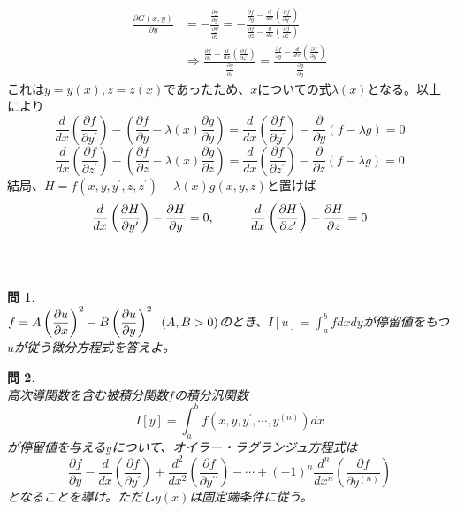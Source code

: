 \documentclass{jsarticle}
\newtheorem{pro}{問}[section]
\begin{document}
\begin{align*}
\frac{\partial G(x,y)}{\partial y}&=-\frac{\frac{\partial g}{\partial y}}{\frac{\partial g}{\partial z}}=-\frac{\frac{\partial f}{\partial y}-\frac{d}{dx}\left(\frac{\partial f}{\partial y^{\prime}}\right)}{\frac{\partial f}{\partial z}-\frac{d}{dx}\left(\frac{\partial f}{\partial z^{\prime}}\right)}\\
&\Longrightarrow\frac{\frac{\partial f}{\partial z}-\frac{d}{dx}\left(\frac{\partial f}{\partial z^{\prime}}\right)}{\frac{\partial g}{\partial z}}=\frac{\frac{\partial f}{\partial y}-\frac{d}{dx}\left(\frac{\partial f}{\partial y^{\prime}}\right)}{\frac{\partial g}{\partial y}}
\end{align*}
これは\(y=y(x),z=z(x)\)であったため、\(x\)についての式\(\lambda(x)\)となる。以上により
\[\frac{d}{dx}\left(\frac{\partial f}{\partial y^{\prime}}\right)-\left(\frac{\partial f}{\partial y}-\lambda(x)\frac{\partial g}{\partial y}\right)=\frac{d}{dx}\left(\frac{\partial f}{\partial y^{\prime}}\right)-\frac{\partial}{\partial y}(f-\lambda g)=0\]
\[\frac{d}{dx}\left(\frac{\partial f}{\partial z^{\prime}}\right)-\left(\frac{\partial f}{\partial z}-\lambda(x)\frac{\partial g}{\partial z}\right)=\frac{d}{dx}\left(\frac{\partial f}{\partial z^{\prime}}\right)-\frac{\partial}{\partial z}(f-\lambda g)=0\]
結局、\(H=f(x,y,y^{\prime},z,z^{\prime})-\lambda(x)g(x,y,z)\)と置けば
\[\frac{d}{dx}\left(\frac{\partial H}{\partial y^{\prime}}\right)-\frac{\partial H}{\partial y}=0,\hspace{10mm}\frac{d}{dx}\left(\frac{\partial H}{\partial z^{\prime}}\right)-\frac{\partial H}{\partial z}=0\]
\\
\\
\newpage
\begin{pro}~\\
\(\displaystyle f=A\left(\frac{\partial u}{\partial x}\right)^{2}-B\left(\frac{\partial u}{\partial y}\right)^{2}\hspace{2mm}(A,B>0)\)のとき、\(\displaystyle I[u]=\int_{a}^{b}fdxdy\)が停留値をもつ\(u\)が従う微分方程式を答えよ。
\end{pro}

\begin{pro}~\\
高次導関数を含む被積分関数\(f\)の積分汎関数
\[I[y]=\int_{a}^{b}f(x,y,y^{\prime},\cdots,y^{(n)})dx\]
が停留値を与える\(y\)について、オイラー・ラグランジュ方程式は
\[\frac{\partial f}{\partial y}-\frac{d}{dx}\left(\frac{\partial f}{\partial y^{\prime}}\right)+\frac{d^{2}}{dx^{2}}\left(\frac{\partial f}{\partial y^{\prime\prime}}\right)-\cdots+(-1)^{n}\frac{d^{n}}{dx^{n}}\left(\frac{\partial f}{\partial y^{(n)}}\right)\]
となることを導け。ただし\(y(x)\)は固定端条件に従う。
\end{pro}
\end{document}
